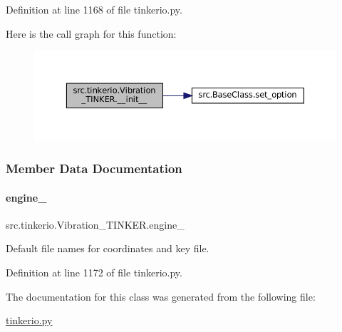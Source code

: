 Definition at line 1168 of file tinkerio.\+py.

Here is the call graph for this function\+:
\nopagebreak
\begin{figure}[H]
\begin{center}
\leavevmode
\includegraphics[width=350pt]{classsrc_1_1tinkerio_1_1Vibration__TINKER_a1852709be36661af5f38a5ec61a48cab_cgraph}
\end{center}
\end{figure}


\subsubsection{Member Data Documentation}
\mbox{\label{classsrc_1_1tinkerio_1_1Vibration__TINKER_a681786cadab4e8556d84e1e821e4e83f}} 
\paragraph{\texorpdfstring{engine\+\_\+}{engine\_}}
{\footnotesize\ttfamily src.\+tinkerio.\+Vibration\+\_\+\+T\+I\+N\+K\+E\+R.\+engine\+\_\+}



Default file names for coordinates and key file. 



Definition at line 1172 of file tinkerio.\+py.



The documentation for this class was generated from the following file\+:\begin{DoxyCompactItemize}
\item 
\hyperlink{tinkerio_8py}{tinkerio.\+py}\end{DoxyCompactItemize}
